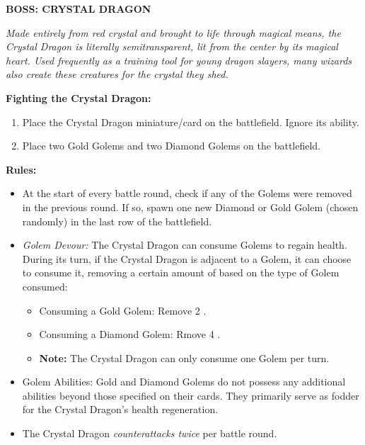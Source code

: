 \begin{minipage}{0.3\textwidth}
\end{minipage}
\begin{minipage}{0.7\textwidth}
  \textbf{\MakeUppercase{Boss: Crystal Dragon}}

  \medskip

  \textit{Made entirely from red crystal and brought to life through magical means, the Crystal Dragon is literally semitransparent, lit from the center by its magical heart.
    Used frequently as a training tool for young dragon slayers, many wizards also create these creatures for the crystal they shed.
  }

  \medskip

  \textbf{Fighting the Crystal Dragon:}
  \begin{enumerate}
    \item Place the Crystal Dragon miniature/card on the battlefield.
      Ignore its ability.
    \item Place two Gold Golems and two Diamond Golems on the battlefield.
  \end{enumerate}

  \medskip

  \textbf{Rules:}
  \begin{itemize}
    \item At the start of every battle round, check if any of the Golems were removed in the previous round.
      If so, spawn one new Diamond or Gold Golem (chosen randomly) in the last row of the battlefield.
    \item \textit{Golem Devour:} The Crystal Dragon can consume Golems to regain health.
      During its turn, if the Crystal Dragon is adjacent to a Golem, it can choose to consume it, removing a certain amount of  based on the type of Golem consumed:
      \begin{itemize}
        \item Consuming a Gold Golem: Remove 2 .
        \item Consuming a Diamond Golem: Rmove 4 .
        \item[] \textbf{Note:} The Crystal Dragon can only consume one Golem per turn.
      \end{itemize}
    \item Golem Abilities: Gold and Diamond Golems do not possess any additional abilities beyond those specified on their cards.
      They primarily serve as fodder for the Crystal Dragon's health regeneration.
    \item The Crystal Dragon \textit{counterattacks twice} per battle round.
  \end{itemize}
\end{minipage}

